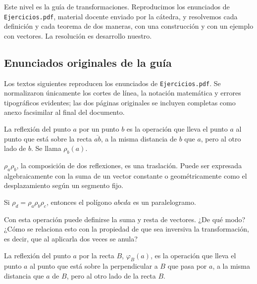 Este nivel es la guía de transformaciones. Reproducimos los enunciados de \texttt{Ejercicios.pdf}, material docente enviado por la cátedra, y resolvemos cada definición y cada teorema de dos maneras, con una construcción y con un ejemplo con vectores. La resolución es desarrollo nuestro.

{\small\vspace{1mm}\par}

\subsection{Enunciados originales de la guía}

Los textos siguientes reproducen los enunciados de \texttt{Ejercicios.pdf}. Se normalizaron
únicamente los cortes de línea, la notación matemática y errores tipográficos evidentes; las
dos páginas originales se incluyen completas como anexo facsimilar al final del documento.

\begin{enunciado}[Definición 1]
La reflexión del punto \(a\) por un punto \(b\) es la operación que lleva el punto \(a\) al
punto que está sobre la recta \(\overline{ab}\), a la misma distancia de \(b\) que \(a\),
pero al otro lado de \(b\). Se llama \(\rho_b(a)\).
\end{enunciado}

\begin{enunciado}[Teorema 1]
\(\rho_a\rho_b\), la composición de dos reflexiones, es una traslación. Puede ser expresada
algebraicamente con la suma de un vector constante o geométricamente como el desplazamiento
según un segmento fijo.
\end{enunciado}

\begin{enunciado}[Teorema 2]
Si \(\rho_d=\rho_a\rho_b\rho_c\), entonces el polígono \(abcda\) es un paralelogramo.
\end{enunciado}

\begin{enunciado}[Observación]
Con esta operación puede definirse la suma y resta de vectores. ¿De qué modo? ¿Cómo se
relaciona esto con la propiedad de que sea inversiva la transformación, es decir, que al
aplicarla dos veces se anula?
\end{enunciado}

\begin{enunciado}[Definición 2]
La reflexión del punto \(a\) por la recta \(B\), \(\varphi_B(a)\), es la operación que lleva
el punto \(a\) al punto que está sobre la perpendicular a \(B\) que pasa por \(a\), a la misma
distancia que \(a\) de \(B\), pero al otro lado de la recta \(B\).
\end{enunciado}

